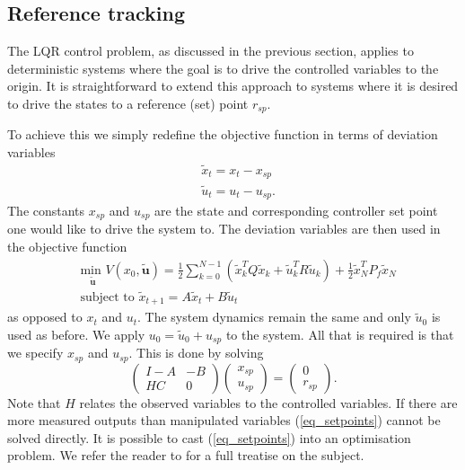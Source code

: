 \subsection{Reference tracking}
\label{sec_lit_ref_track}
The LQR control problem, as discussed in the previous section, applies to deterministic systems where the goal is to drive the controlled variables to the origin. It is straightforward to extend this approach to systems where it is desired to drive the states to a reference (set) point $r_{sp}$.

To achieve this we simply redefine the objective function in terms of deviation variables 
\begin{equation}
\begin{aligned}
&\tilde{x}_t = x_t-x_{sp} \\
&\tilde{u}_t = u_t-u_{sp}.
\end{aligned}
\label{eq_dev_vars}
\end{equation}
The constants $x_{sp}$ and $u_{sp}$ are the state and corresponding controller set point one would like to drive the system to. The deviation variables are then used in the objective function 
\begin{equation}
\begin{aligned}
&\underset{\tilde{\mathbf{u}}}{\text{min }} V(x_0, \tilde{\mathbf{u}}) = \frac{1}{2}\sum_{k=0}^{N-1} \left( \tilde{x}_k^TQ\tilde{x}_k + \tilde{u}_k^TR\tilde{u}_k \right) + \frac{1}{2}\tilde{x}_N^TP_f\tilde{x}_N \\
& \text{subject to } \tilde{x}_{t+1}=A\tilde{x}_t+B\tilde{u}_t
\end{aligned}
\label{eq_lqr_problem_dev}
\end{equation}
as opposed to $x_t$ and $u_t$. The system dynamics remain the same \cite{raw} and only $\tilde{u}_0$ is used as before. We apply $u_0 = \tilde{u}_0 + u_{sp}$ to the system. All that is required is that we specify $x_{sp}$ and $u_{sp}$. This is done by solving
\begin{equation}
\begin{pmatrix}
I-A &- B \\ HC & 0
\end{pmatrix} \begin{pmatrix}
x_{sp}\\u_{sp}
\end{pmatrix} = \begin{pmatrix}
0 \\ r_{sp}
\end{pmatrix}.
\label{eq_setpoints}
\end{equation}
Note that $H$ relates the observed variables to the controlled variables. If there are more measured outputs than manipulated variables (\ref{eq_setpoints}) cannot be solved directly. It is possible to cast (\ref{eq_setpoints}) into an optimisation problem. We refer the reader to \cite{raw} for a full treatise on the subject.
 
